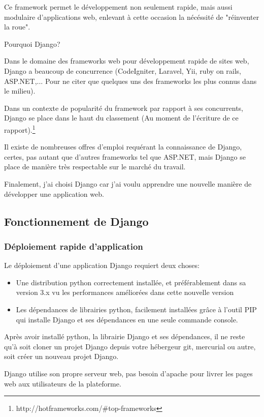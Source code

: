 \documentclass[12pt,table,a4paper]{report}
\begin{document}
Ce framework permet le développement non seulement rapide, mais aussi modulaire d'applications web, enlevant à cette occasion la nécéssité de "réinventer la roue".

Pourquoi Django?

Dans le domaine des frameworks web pour développement rapide de sites web, Django a beaucoup de concurrence (CodeIgniter, Laravel, Yii, ruby on rails, ASP.NET,... Pour ne citer que quelques uns des frameworks les plus connus dans le milieu).

Dans un contexte de popularité du framework par rapport à ses concurrents, Django se place dans le haut du classement (Au moment de l'écriture de ce rapport).\footnote{http://hotframeworks.com/\#top-frameworks}

Il existe de nombreuses offres d'emploi requérant la connaissance de Django, certes, pas autant que d'autres frameworks tel que ASP.NET, mais Django se place de manière très respectable sur le marché du travail.

Finalement, j'ai choisi Django car j'ai voulu apprendre une nouvelle manière de développer une application web.

\subsection{Fonctionnement de Django}
\subsubsection{Déploiement rapide d'application}
Le déploiement d'une application Django requiert deux choses:

\begin{itemize}
	\item{Une distribution python correctement installée, et préférablement dans sa version 3.x vu les performances améliorées dans cette nouvelle version}
	\item{Les dépendances de librairies python, facilement installées grâce à l'outil PIP qui installe Django et ses dépendances en une seule commande console.}
\end{itemize}

Après avoir installé python, la librairie Django et ses dépendances, il ne reste qu'à soit cloner un projet Django depuis votre hébergeur git, mercurial ou autre, soit créer un nouveau projet Django.

Django utilise son propre serveur web, pas besoin d'apache pour livrer les pages web aux utilisateurs de la plateforme.
\end{document}
